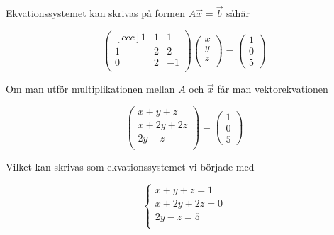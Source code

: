 \documentclass[../../main.tex]{subfiles}
\begin{document}
\begin{solution}{4} 

Ekvationssystemet kan skrivas på formen $A\Vec{x}=\Vec{b}$ såhär

$$
\begin{pmatrix}[ccc]
1 & 1 & 1\\
1 & 2 & 2\\
0 & 2 & -1\\ 
\end{pmatrix}\begin{pmatrix}
x\\
y\\
z\\
\end{pmatrix} = \begin{pmatrix}
1\\
0\\
5
\end{pmatrix}
$$

Om man utför multiplikationen mellan $A$ och $\Vec{x}$ får man vektorekvationen

$$\begin{pmatrix}
x + y + z\\
x + 2y + 2z\\
2y - z\\
\end{pmatrix}=\begin{pmatrix}
1\\0\\5
\end{pmatrix}$$

Vilket kan skrivas som ekvationssystemet vi började med

$$
\begin{cases}
x + y + z = 1\\
x + 2y + 2z = 0\\
2y - z = 5\\
\end{cases}
$$
\end{solution}
\end{document}
